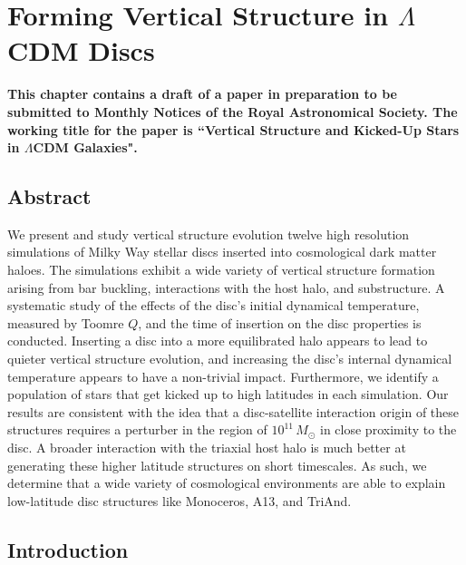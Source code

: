 
\newcommand{\kpch}{\ensuremath{h^{-1} \, \text{kpc}}}
\newcommand{\kpc}{\ensuremath{\text{kpc}}}
\newcommand{\solarmh}{\ensuremath{h^{-1} \, M_\odot}}
\newcommand{\solarm}{M_\odot}
\chapter{Forming Vertical Structure in $\Lambda$CDM Discs}\label{ch:paper_iii}
\textbf{This chapter contains a draft of a paper in preparation to be submitted to Monthly Notices of the Royal Astronomical Society. The working title for the paper is ``Vertical Structure and Kicked-Up Stars in $\Lambda$CDM Galaxies". }

\newpage
\section{Abstract}

We present and study vertical structure evolution twelve high resolution simulations of Milky Way stellar discs inserted into cosmological dark matter haloes. The simulations exhibit a wide variety of vertical structure formation arising from bar buckling, interactions with the host halo, and substructure. A systematic study of the effects of the disc's initial dynamical temperature, measured by Toomre $Q$, and the time of insertion on the disc properties is conducted. Inserting a disc into a more equilibrated halo appears to lead to quieter vertical structure evolution, and increasing the disc's internal dynamical temperature appears to have a non-trivial impact. Furthermore, we identify a population of stars that get kicked up to high latitudes in each simulation. Our results are consistent with the idea that a disc-satellite interaction origin of these structures requires a perturber in the region of $10^{11} \, \solarm$ in close proximity to the disc. A broader interaction with the triaxial host halo is much better at generating these higher latitude structures on short timescales.  As such, we determine that a wide variety of cosmological environments are able to explain low-latitude disc structures like Monoceros, A13, and TriAnd. 

\vspace{1in}

\section{Introduction} \label{sec:introduction}


